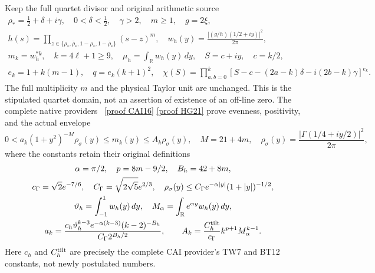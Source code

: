 \documentclass[11pt]{article}
\newcommand{\R}{\mathbb R}
\begin{document}
Keep the full quartet divisor and original arithmetic source
\begin{equation}\label{eq:native}
 \begin{gathered}
 \rho_*=\tfrac12+\delta+i\gamma,\quad0<\delta<\tfrac12,\quad\gamma>2,
 \quad m\ge1,\quad g=2\xi,\\
 h(s)=\prod_{z\in\{\rho_*,\bar\rho_*,1-\rho_*,1-\bar\rho_*\}}(s-z)^m,
 \quad w_h(y)=\frac{|(g/h)(1/2+iy)|^2}{2\pi},\\
 m_k=w_h^{*k},\quad k=4\ell+1\ge9,\quad
 \mu_h=\int_\R w_h(y)\,dy,\quad S=c+iy,\quad c=k/2,\\
 e_k=1+k(m-1),\quad q=e_k(k+1)^2,\quad
 \chi(S)=\prod_{a,b=0}^k
 [S-c-(2a-k)\delta-i(2b-k)\gamma]^{e_k}.
 \end{gathered}
\end{equation}
The full multiplicity $m$ and the physical Taylor unit are unchanged.
This is the stipulated quartet domain, not an assertion of existence of
an off-line zero.  The complete native providers \cite{CAI,HG}%
~\href{https://github.com/KokunoYumeto/zeta-function-research-reader/blob/487253b5b01851da5b9b98af4e146fecf1fab902/workbenches/splitzero-tandem/continuations/20260919-full-window-source-products/providers/CAI_COMPLETE_PREREQUISITE.tex\#L284}{[proof CAI16]} \href{https://github.com/KokunoYumeto/zeta-function-research-reader/blob/5992ad50c0f2a06921f1fcaded7b4e38097c0739/workbenches/splitzero-tandem/continuations/20260920-original-kernel-mixed-determinants/providers/HEAT_GROWTH_AND_ORIGINAL_CURRENTS.tex\#L374}{[proof HG21]}%
{} prove
evenness, positivity, and the actual envelope
\begin{equation}\label{eq:envelope}
 0<a_k(1+y^2)^{-M}\rho_\sigma(y)\le m_k(y)\le A_k\rho_\sigma(y),
 \quad M=21+4m,\quad
 \rho_\sigma(y)=\frac{|\Gamma(1/4+iy/2)|^2}{2\pi},
\end{equation}
where the constants retain their original definitions
\begin{equation}\label{eq:constants}
 \begin{gathered}
 \alpha=\pi/2,\quad p=8m-9/2,\quad B_h=42+8m,\\
 c_\Gamma=\sqrt2e^{-7/6},\quad
 C_\Gamma=\sqrt{2\sqrt5}e^{2/3},\quad
 \rho_\sigma(y)\le C_\Gamma e^{-\alpha|y|}(1+|y|)^{-1/2},\\
 \vartheta_h=\int_{-1}^1w_h(y)\,dy,\quad
 M_\alpha=\int_\R e^{\alpha y}w_h(y)\,dy,\\
 a_k=\frac{c_h\vartheta_h^{k-3}e^{-\alpha(k-3)}(k-2)^{-B_h}}
 {C_\Gamma2^{B_h/2}},\qquad
 A_k=\frac{C_h^{\rm tilt}}{c_\Gamma}k^{p+1}M_\alpha^{k-1}.
 \end{gathered}
\end{equation}
Here $c_h$ and $C_h^{\rm tilt}$ are precisely the complete CAI
provider's TW7 and BT12 constants, not newly postulated numbers.
\end{document}
